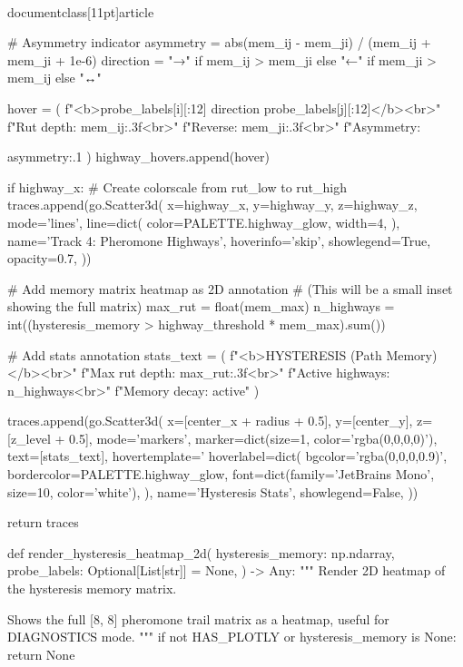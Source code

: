 \\documentclass[11pt]{article}
\begin{document}
\begin{CodeBlock}
{{            # Asymmetry indicator
            asymmetry = abs(mem_ij - mem_ji) / (mem_ij + mem_ji + 1e-6)
            direction = "→" if mem_ij > mem_ji else "←" if mem_ji > mem_ij else "↔"

            hover = (
                f"<b>{probe_labels[i][:12]} {direction} {probe_labels[j][:12]}</b><br>"
                f"Rut depth: {mem_ij:.3f}<br>"
                f"Reverse: {mem_ji:.3f}<br>"
                f"Asymmetry: {asymmetry:.1%
            )
            highway_hovers.append(hover)

    if highway_x:
        # Create colorscale from rut_low to rut_high
        traces.append(go.Scatter3d(
            x=highway_x, y=highway_y, z=highway_z,
            mode='lines',
            line=dict(
                color=PALETTE.highway_glow,
                width=4,
            ),
            name='Track 4: Pheromone Highways',
            hoverinfo='skip',
            showlegend=True,
            opacity=0.7,
        ))

    # Add memory matrix heatmap as 2D annotation
    # (This will be a small inset showing the full matrix)
    max_rut = float(mem_max)
    n_highways = int((hysteresis_memory > highway_threshold * mem_max).sum())

    # Add stats annotation
    stats_text = (
        f"<b>HYSTERESIS (Path Memory)</b><br>"
        f"Max rut depth: {max_rut:.3f}<br>"
        f"Active highways: {n_highways}<br>"
        f"Memory decay: active"
    )

    traces.append(go.Scatter3d(
        x=[center_x + radius + 0.5],
        y=[center_y],
        z=[z_level + 0.5],
        mode='markers',
        marker=dict(size=1, color='rgba(0,0,0,0)'),
        text=[stats_text],
        hovertemplate='%
        hoverlabel=dict(
            bgcolor='rgba(0,0,0,0.9)',
            bordercolor=PALETTE.highway_glow,
            font=dict(family='JetBrains Mono', size=10, color='white'),
        ),
        name='Hysteresis Stats',
        showlegend=False,
    ))

    return traces


def render_hysteresis_heatmap_2d(
    hysteresis_memory: np.ndarray,
    probe_labels: Optional[List[str]] = None,
) -> Any:
    """
    Render 2D heatmap of the hysteresis memory matrix.

    Shows the full [8, 8] pheromone trail matrix as a heatmap,
    useful for DIAGNOSTICS mode.
    """
    if not HAS_PLOTLY or hysteresis_memory is None:
        return None

}}}
\end{CodeBlock}
\end{document}
